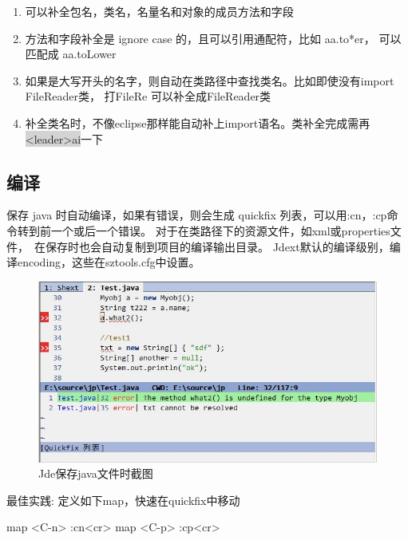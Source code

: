 \documentclass[oneside,openany]{book}
\begin{document}
    \begin{enumerate}
      \item 可以补全包名，类名，名量名和对象的成员方法和字段
      \item 方法和字段补全是 ignore case 的，且可以引用通配符，比如 aa.to*er， 可以匹配成 aa.toLower
      \item 如果是大写开头的名字，则自动在类路径中查找类名。比如即使没有import FileReader类， 打FileRe 可以补全成FileReader类 
      \item 补全类名时，不像eclipse那样能自动补上import语名。类补全完成需再\colorbox{lightgray}{<leader>ai}一下
    \end{enumerate}
    
\subsection{编译}
    保存 java 时自动编译，如果有错误，则会生成 quickfix 列表，可以用:cn，:cp命令转到前一个或后一个错误。
    对于在类路径下的资源文件，如xml或properties文件，　在保存时也会自动复制到项目的编译输出目录。
    Jdext默认的编译级别，编译encoding，这些在sztools.cfg中设置。

  \begin{figure}[htbp]%
  \centering
  \includegraphics[scale=0.5]{compile.jpg}
  \caption{Jde保存java文件时截图}
  \end{figure}

  \begin{mdframed}[style=BestPracticeFrame]
  \begin{flushleft}
    最佳实践: 定义如下map，快速在quickfix中移动

    map <C-n> :cn<cr>\newline
    map <C-p> :cp<cr>
  \end{flushleft}
  \end{mdframed}
\end{document}
